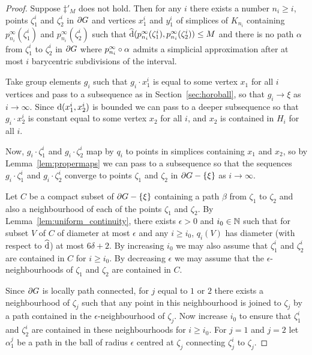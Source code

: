 \documentclass[a4paper]{article}
\begin{document}
\begin{proof}
  Suppose $\ddag'_M$ does not hold. Then for any $i$ there exists a number $n_i
  \geq i$, points $\zeta_1^i$ and $\zeta_2^i$ in $\partial G$ and vertices
  $x_1^i$ and $y_1^i$ of simplices of $K_{n_i}$ containing
  $p^\infty_{n_i}(\zeta^i_1)$ and $p^\infty_{n_i}(\zeta^i_2)$ such that
  $\operatorname{\widehat{d}}(p^\infty_{n_i}(\zeta^i_1), p^\infty_{n_i}(\zeta^i_2)) \leq M$ and
  there is no path $\alpha$ from $\zeta_1^i$ to $\zeta_2^i$ in $\partial G$
  where $p^\infty_{n_i}\circ\alpha$ admits a simplicial approximation after
  at most $i$ barycentric subdivisions of the interval.

  Take group elements $g_i$ such that $g_i\cdot x_1^i$ is equal to some vertex
  $x_1$ for all $i$ vertices and pass to a subsequence as in
  Section~\ref{sec:horoball}, so that $g_i\to\xi$ as $i \to\infty$. Since
  $\operatorname{d}(x_1^i, x_2^i)$ is bounded we can pass to a deeper subsequence so that
  $g_i\cdot x_2^i$ is constant equal to some vertex $x_2$ for all $i$, and
  $x_2$ is contained in $H_i$ for all $i$. 

  Now, $g_i\cdot \zeta_1^i$ and $g_i\cdot\zeta_2^i$ map by $q_i$ to points in
  simplices containing $x_1$ and $x_2$, so by Lemma~\ref{lem:propermaps} we
  can pass to a subsequence so that the sequences $g_i\cdot \zeta_1^i$ and
  $g_i\cdot\zeta_2^i$ converge to points $\zeta_1$ and $\zeta_2$ in $\partial
  G - \left\{\xi\right\}$ as $i \to \infty$.
  
  Let $C$ be a compact subset of $\partial G - \left\{\xi\right\}$ containing a path
  $\beta$ from $\zeta_1$ to $\zeta_2$ and also a neighbourhood of each of the
  points $\zeta_1$ and $\zeta_2$. By Lemma~\ref{lem:uniform_continuity}, there
  exists $\epsilon > 0$ and $i_0 \in \mathbb{N}$ such that for subset $V$ of
  $C$ of diameter at most $\epsilon$ and any $i \geq i_0$, $q_i(V)$ has
  diameter (with respect to $\operatorname{\widehat{d}}$) at most $6\delta+2$. By increasing
  $i_0$ we may also assume that $\zeta_1^i$ and $\zeta_2^i$ are contained in
  $C$ for $i \geq i_0$. By decreasing $\epsilon$ we may assume that the
  $\epsilon$-neighbourhoods of $\zeta_1$ and $\zeta_2$ are contained in $C$. 

  Since $\partial G$ is locally path connected, for $j$ equal to $1$ or $2$
  there exists a neighbourhood of $\zeta_j$ such that any point in this
  neighbourhood is joined to $\zeta_j$ by a path contained in the
  $\epsilon$-neighbourhood of $\zeta_j$. Now increase $i_0$ to ensure that
  $\zeta_1^i$ and $\zeta_2^i$ are contained in these neighbourhoods for $i \geq
  i_0$. For $j=1$ and $j=2$ let $\alpha_1^j$ be a path in the ball of radius
  $\epsilon$ centred at $\zeta_j$ connecting $\zeta_j^i$ to $\zeta_j$.


\end{proof}
\end{document}
